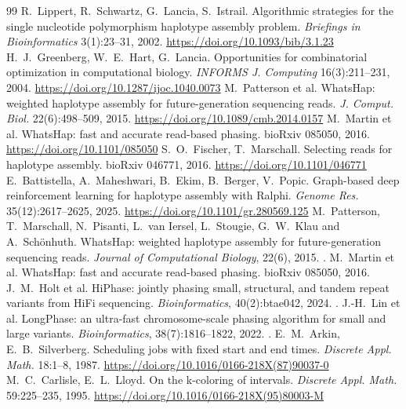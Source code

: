 \begin{thebibliography}{99}
 R.~Lippert, R.~Schwartz, G.~Lancia, S.~Istrail. Algorithmic strategies for the single nucleotide polymorphism haplotype assembly problem. \emph{Briefings in Bioinformatics} 3(1):23--31, 2002. \url{https://doi.org/10.1093/bib/3.1.23}
 H.~J.~Greenberg, W.~E.~Hart, G.~Lancia. Opportunities for combinatorial optimization in computational biology. \emph{INFORMS J. Computing} 16(3):211--231, 2004. \url{https://doi.org/10.1287/ijoc.1040.0073}
 M.~Patterson et al. WhatsHap: weighted haplotype assembly for future-generation sequencing reads. \emph{J. Comput. Biol.} 22(6):498--509, 2015. \url{https://doi.org/10.1089/cmb.2014.0157}
 M.~Martin et al. WhatsHap: fast and accurate read-based phasing. bioRxiv 085050, 2016. \url{https://doi.org/10.1101/085050}
 S.~O.~Fischer, T.~Marschall. Selecting reads for haplotype assembly. bioRxiv 046771, 2016. \url{https://doi.org/10.1101/046771}
 E.~Battistella, A.~Maheshwari, B.~Ekim, B.~Berger, V.~Popic. Graph-based deep reinforcement learning for haplotype assembly with Ralphi. \emph{Genome Res.} 35(12):2617--2625, 2025. \url{https://doi.org/10.1101/gr.280569.125}
M.~Patterson, T.~Marschall, N.~Pisanti, L.~van Iersel, L.~Stougie,
G.~W.~Klau and A.~Sch\"onhuth.
\newblock WhatsHap: weighted haplotype assembly for future-generation
sequencing reads.
\newblock \emph{Journal of Computational Biology}, 22(6), 2015.
\newblock {}.
M.~Martin et al.
\newblock WhatsHap: fast and accurate read-based phasing.
\newblock bioRxiv 085050, 2016.
J.~M.~Holt et al.
\newblock HiPhase: jointly phasing small, structural, and tandem repeat
variants from HiFi sequencing.
\newblock \emph{Bioinformatics}, 40(2):btae042, 2024.
\newblock {}.
J.-H.~Lin et al.
\newblock LongPhase: an ultra-fast chromosome-scale phasing algorithm for
small and large variants.
\newblock \emph{Bioinformatics}, 38(7):1816--1822, 2022.
\newblock {}.
 E.~M.~Arkin, E.~B.~Silverberg. Scheduling jobs with fixed start and end times. \emph{Discrete Appl. Math.} 18:1--8, 1987. \url{https://doi.org/10.1016/0166-218X(87)90037-0}
 M.~C.~Carlisle, E.~L.~Lloyd. On the k-coloring of intervals. \emph{Discrete Appl. Math.} 59:225--235, 1995. \url{https://doi.org/10.1016/0166-218X(95)80003-M}

\end{thebibliography}

